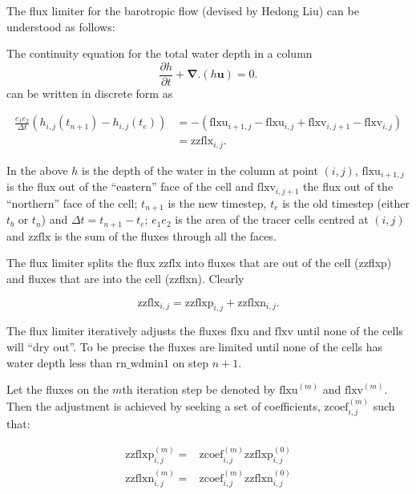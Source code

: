 \documentclass[../main/NEMO_manual]{subfiles}
\begin{document}
The flux limiter for the barotropic flow (devised by Hedong Liu) can be understood as follows:

The continuity equation for the total water depth in a column
\begin{equation}
  \label{eq:DYN_wd_continuity}
  \frac{\partial h}{\partial t} + \mathbf{\nabla.}(h\mathbf{u}) = 0 .
\end{equation}
can be written in discrete form  as

\begin{align}
  \label{eq:DYN_wd_continuity_2}
  \frac{e_1 e_2}{\Delta t} ( h_{i,j}(t_{n+1}) - h_{i,j}(t_e) )
  &= - ( \mathrm{flxu}_{i+1,j} - \mathrm{flxu}_{i,j}  + \mathrm{flxv}_{i,j+1} - \mathrm{flxv}_{i,j} ) \\
  &= \mathrm{zzflx}_{i,j} .
\end{align}

In the above $h$ is the depth of the water in the column at point $(i,j)$,
$\mathrm{flxu}_{i+1,j}$ is the flux out of the ``eastern'' face of the cell and
$\mathrm{flxv}_{i,j+1}$ the flux out of the ``northern'' face of the cell; $t_{n+1}$ is
the new timestep, $t_e$ is the old timestep (either $t_b$ or $t_n$) and $ \Delta t =
t_{n+1} - t_e$; $e_1 e_2$ is the area of the tracer cells centred at $(i,j)$ and
$\mathrm{zzflx}$ is the sum of the fluxes through all the faces.

The flux limiter splits the flux $\mathrm{zzflx}$ into fluxes that are out of the cell
(zzflxp) and fluxes that are into the cell (zzflxn).  Clearly

\begin{equation}
  \label{eq:DYN_wd_zzflx_p_n_1}
  \mathrm{zzflx}_{i,j} = \mathrm{zzflxp}_{i,j} + \mathrm{zzflxn}_{i,j} .
\end{equation}

The flux limiter iteratively adjusts the fluxes $\mathrm{flxu}$ and $\mathrm{flxv}$ until
none of the cells will ``dry out''. To be precise the fluxes are limited until none of the
cells has water depth less than $\mathrm{rn\_wdmin1}$ on step $n+1$.

Let the fluxes on the $m$th iteration step be denoted by $\mathrm{flxu}^{(m)}$ and
$\mathrm{flxv}^{(m)}$.  Then the adjustment is achieved by seeking a set of coefficients,
$\mathrm{zcoef}_{i,j}^{(m)}$ such that:

\begin{equation}
  \label{eq:DYN_wd_continuity_coef}
  \begin{split}
    \mathrm{zzflxp}^{(m)}_{i,j} =& \mathrm{zcoef}_{i,j}^{(m)} \mathrm{zzflxp}^{(0)}_{i,j} \\
    \mathrm{zzflxn}^{(m)}_{i,j} =& \mathrm{zcoef}_{i,j}^{(m)} \mathrm{zzflxn}^{(0)}_{i,j}
  \end{split}
\end{equation}
\end{document}
